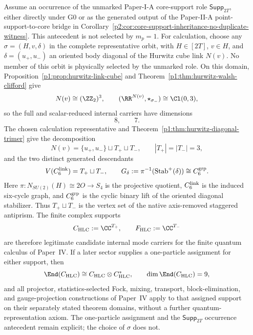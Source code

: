 \documentclass[12pt,a4paper]{article}
\begin{document}
\begin{theorem}
\label{p4:thm:hurwitz-link-finite-support-import}
Assume an occurrence of the unmarked Paper-I-A core-support role
\(\mathsf{Supp}_{2T}\), either directly under G0 or as the generated output
of the Paper-II-A point-support-to-core bridge in
Corollary~\ref{p2:cor:core-support-inheritance-no-duplicate-witness}.
This antecedent is not selected by \(m_p=1\).  For calculation, choose any
\(\sigma=(H,v,\delta)\) in the complete representative orbit, with
\(H\in[2T]\), \(v\in H\), and \(\delta=(u_+,u_-)\) an oriented body
diagonal of the Hurwitz cube link \(N(v)\).  No member of this orbit is
physically selected by the unmarked role.
On this domain, Proposition~\ref{p1:prop:hurwitz-link-cube} and
Theorem~\ref{p1:thm:hurwitz-walsh-clifford} give
\[
N(v)\cong(\ZZ_2)^3,
\qquad
(\RR^{N(v)},\star_{\sigma_-})\cong\Cl(0,3),
\]
so the full and scalar-reduced internal carriers have dimensions
\[
8,
\qquad
7.
\]
The chosen calculation representative and
Theorem~\ref{p1:thm:hurwitz-diagonal-trimer} give the decomposition
\[
N(v)=\{u_+,u_-\}\sqcup T_+\sqcup T_-,
\qquad
|T_+|=|T_-|=3,
\]
and the two distinct generated descendants
\[
  V(C_6^{\rm link})=T_+\sqcup T_-,
  \qquad
  G_\delta:=\pi^{-1}(\operatorname{Stab}^{+}(\delta))
      \cong C_6^{\rm grp}.
\]
Here \(\pi:N_{SU(2)}(H)\cong2O\to S_4\) is the projective quotient,
\(C_6^{\rm link}\) is the induced six-cycle graph, and
\(C_6^{\rm grp}\) is the cyclic binary lift of the oriented diagonal
stabilizer.
Thus \(T_+\sqcup T_-\) is the vertex set of the native axis-removed
staggered antiprism.  The finite complex supports
\[
C_{\rm HLC}:=\CC^{T_+},
\qquad
F_{\rm HLC}:=\CC^{T_-}
\]
are therefore legitimate candidate internal mode carriers for the finite
quantum calculus of Paper~IV.  If a later sector supplies a one-particle
assignment for either support, then
\[
\End(C_{\rm HLC})\cong C_{\rm HLC}\otimes C_{\rm HLC}^*,
\qquad
\dim \End(C_{\rm HLC})=9,
\]
and all projector, statistics-selected Fock, mixing, transport,
block-elimination, and gauge-projection constructions of Paper~IV apply to
that assigned support on their separately stated theorem domains, without a
further quantum-representation axiom.  The one-particle assignment and the
\(\mathsf{Supp}_{2T}\) occurrence antecedent remain explicit; the choice of
\(\sigma\) does not.
\end{theorem}
\end{document}
